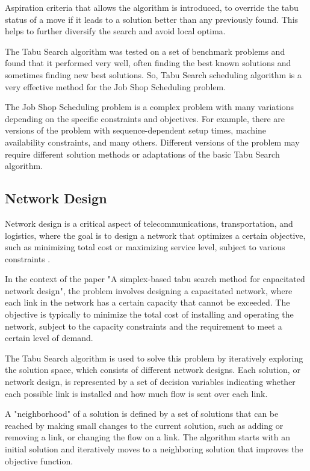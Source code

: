 \documentclass[conference]{IEEEtran}
\begin{document}
Aspiration criteria that allows the algorithm is introduced, to override the tabu status of a move if it leads to a solution better than any previously found. This helps to further diversify the search and avoid local optima.

The Tabu Search algorithm was tested on a set of benchmark problems and found that it performed very well, often finding the best known solutions and sometimes finding new best solutions. So, Tabu Search scheduling algorithm is a very effective method for the Job Shop Scheduling problem.

The Job Shop Scheduling problem is a complex problem with many variations depending on the specific constraints and objectives. For example, there are versions of the problem with sequence-dependent setup times, machine availability constraints, and many others. Different versions of the problem may require different solution methods or adaptations of the basic Tabu Search algorithm.

\subsection{Network Design}

Network design is a critical aspect of telecommunications, transportation, and logistics, where the goal is to design a network that optimizes a certain objective, such as minimizing total cost or maximizing service level, subject to various constraints \cite{crainic1998simplex}.

In the context of the paper "A simplex-based tabu search method for capacitated network design", the problem involves designing a capacitated network, where each link in the network has a certain capacity that cannot be exceeded. The objective is typically to minimize the total cost of installing and operating the network, subject to the capacity constraints and the requirement to meet a certain level of demand.

The Tabu Search algorithm is used to solve this problem by iteratively exploring the solution space, which consists of different network designs. Each solution, or network design, is represented by a set of decision variables indicating whether each possible link is installed and how much flow is sent over each link.

A "neighborhood" of a solution is defined by a set of solutions that can be reached by making small changes to the current solution, such as adding or removing a link, or changing the flow on a link. The algorithm starts with an initial solution and iteratively moves to a neighboring solution that improves the objective function.
\end{document}
